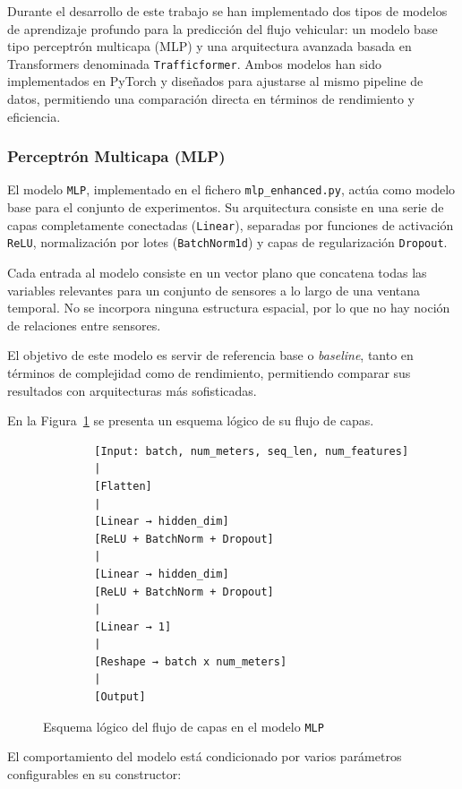 Durante el desarrollo de este trabajo se han implementado dos tipos de modelos de aprendizaje profundo para la predicción del flujo vehicular: un modelo base tipo perceptrón multicapa (MLP) y una arquitectura avanzada basada en Transformers denominada \texttt{Trafficformer}. Ambos modelos han sido implementados en PyTorch y diseñados para ajustarse al mismo pipeline de datos, permitiendo una comparación directa en términos de rendimiento y eficiencia.

\subsubsection{Perceptrón Multicapa (MLP)}

El modelo \texttt{MLP}, implementado en el fichero \texttt{mlp\_enhanced.py}, actúa como modelo base para el conjunto de experimentos. Su arquitectura consiste en una serie de capas completamente conectadas (\texttt{Linear}), separadas por funciones de activación \texttt{ReLU}, normalización por lotes (\texttt{BatchNorm1d}) y capas de regularización \texttt{Dropout}.

Cada entrada al modelo consiste en un vector plano que concatena todas las variables relevantes para un conjunto de sensores a lo largo de una ventana temporal. No se incorpora ninguna estructura espacial, por lo que no hay noción de relaciones entre sensores.

El objetivo de este modelo es servir de referencia base o \textit{baseline}, tanto en términos de complejidad como de rendimiento, permitiendo comparar sus resultados con arquitecturas más sofisticadas.

En la Figura~\ref{fig:mlp_enhanced_vertical} se presenta un esquema lógico de su flujo de capas.

\begin{figure}[H]
	\centering
	\caption{Esquema lógico del flujo de capas en el modelo \texttt{MLP}}
	\label{fig:mlp_enhanced_vertical}
	\begin{verbatim}
		[Input: batch, num_meters, seq_len, num_features]
		|
		[Flatten]
		|
		[Linear → hidden_dim]
		[ReLU + BatchNorm + Dropout]
		|
		[Linear → hidden_dim]
		[ReLU + BatchNorm + Dropout]
		|
		[Linear → 1]
		|
		[Reshape → batch x num_meters]
		|
		[Output]
	\end{verbatim}
\end{figure}

El comportamiento del modelo está condicionado por varios parámetros configurables en su constructor:

